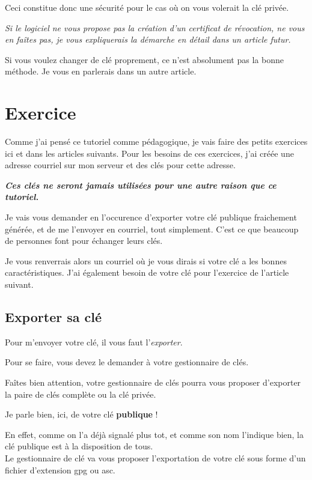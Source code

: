 Ceci constitue donc une sécurité pour le cas où on vous volerait la clé
privée.

\emph{Si le logiciel ne vous propose pas la création d'un certificat de
révocation, ne vous en faîtes pas, je vous expliquerais la démarche en
détail dans un article futur.}

Si vous voulez changer de clé proprement, ce n'est absolument pas la
bonne méthode. Je vous en parlerais dans un autre article.

\section{Exercice}\label{exercice}

Comme j'ai pensé ce tutoriel comme pédagogique, je vais faire des petits
exercices ici et dans les articles suivants. Pour les besoins de ces
exercices, j'ai créée une adresse courriel sur mon serveur et des clés
pour cette adresse.

\textbf{\emph{Ces clés ne seront jamais utilisées pour une autre raison
que ce tutoriel.}}

Je vais vous demander en l'occurence d'exporter votre clé publique
fraichement générée, et de me l'envoyer en courriel, tout simplement.
C'est ce que beaucoup de personnes font pour échanger leurs clés.

Je vous renverrais alors un courriel où je vous dirais si votre clé a
les bonnes caractéristiques. J'ai également besoin de votre clé pour
l'exercice de l'article suivant.

\subsection{Exporter sa clé}\label{exporter-sa-cluxe9}

Pour m'envoyer votre clé, il vous faut l'\emph{exporter}.

Pour se faire, vous devez le demander à votre gestionnaire de clés.

Faîtes bien attention, votre gestionnaire de clés pourra vous proposer
d'exporter la paire de clés complète ou la clé privée.

Je parle bien, ici, de votre clé \textbf{publique} !

En effet, comme on l'a déjà signalé plus tot, et comme son nom l'indique
bien, la clé publique est à la disposition de tous.\\Le gestionnaire de
clé va vous proposer l'exportation de votre clé sous forme d'un fichier
d'extension gpg ou asc.

